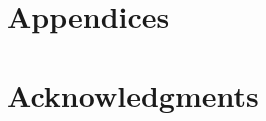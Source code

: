 \documentclass[a4paper, 10pt, conference]{ieeeconf}      %
\begin{document}
\addtolength{\textheight}{-12cm}   %







\section*{Appendices}

\section*{Acknowledgments}


\end{document}
